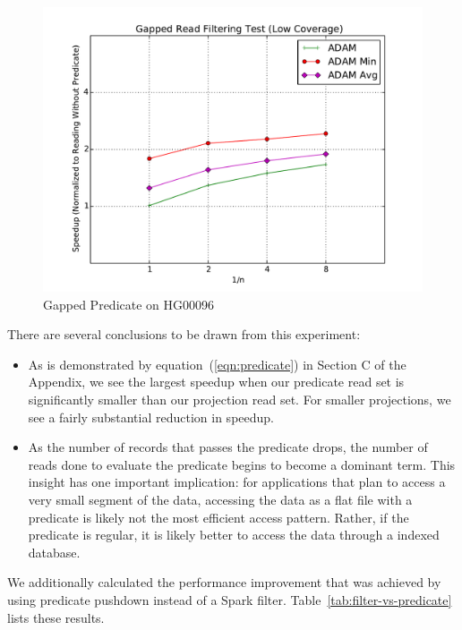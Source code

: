 \documentclass{acm_proc_article-sp}
\begin{document}
\begin{figure}[h]
\begin{center}
\includegraphics[width=\linewidth]{microbenchmarks/gapped_predicate_low_coverage.pdf}
\end{center}
\caption{Gapped Predicate on HG00096}
\label{fig:gapped-filter}
\end{figure}

There are several conclusions to be drawn from this experiment:

\begin{itemize}
\item As is demonstrated by equation~(\ref{eqn:predicate}) in Section C of the Appendix, we see the largest speedup when our predicate read set is significantly
smaller than our projection read set. For smaller projections, we see a fairly substantial reduction in speedup.
\item As the number of records that passes the predicate drops, the number of reads done to evaluate the predicate begins to become
a dominant term. This insight has one important implication: for applications that plan to access a very small segment of the data, accessing the
data as a flat file with a predicate is likely not the most efficient access pattern. Rather, if the predicate is regular, it is likely better to access
the data through a indexed database.
\end{itemize}

We additionally calculated the performance improvement that was achieved by using predicate pushdown instead of a Spark filter.
Table~\ref{tab:filter-vs-predicate} lists these results.
\end{document}
